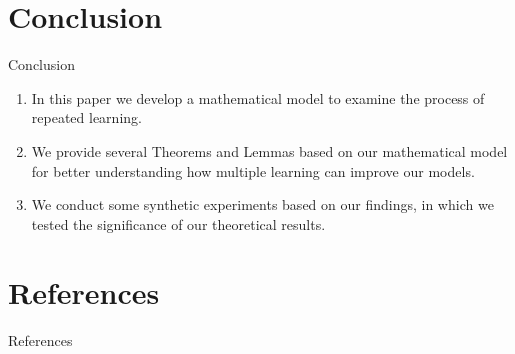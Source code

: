 \documentclass[10pt]{beamer}
\begin{document}
\section{Conclusion}

    \begin{frame}{Conclusion}
        \begin{enumerate}
            \item In this paper we develop a mathematical model to examine the process of repeated learning.

            \item We provide several Theorems and Lemmas based on our mathematical model for better understanding how multiple learning can improve our models.

            \item We conduct some synthetic experiments based on our findings, in which we tested the significance of our theoretical results.
        \end{enumerate}
    \end{frame}





\section{References}
    \begin{frame}{References}
        \footnotesize
        
          
    \end{frame} 
\end{document}
